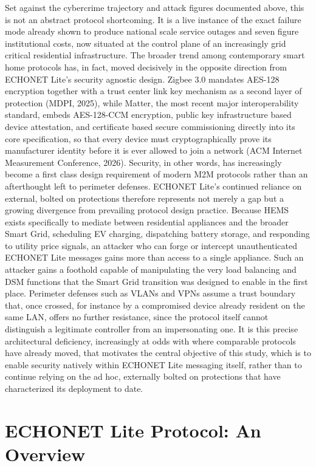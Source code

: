 Set against the cybercrime trajectory and attack figures documented above, this is not an abstract protocol shortcoming. It is a live instance of the exact failure mode already shown to produce national scale service outages and seven figure institutional costs, now situated at the control plane of an increasingly grid critical residential infrastructure. The broader trend among contemporary smart home protocols has, in fact, moved decisively in the opposite direction from ECHONET Lite's security agnostic design. Zigbee 3.0 mandates AES-128 encryption together with a trust center link key mechanism as a second layer of protection (MDPI, 2025), while Matter, the most recent major interoperability standard, embeds AES-128-CCM encryption, public key infrastructure based device attestation, and certificate based secure commissioning directly into its core specification, so that every device must cryptographically prove its manufacturer identity before it is ever allowed to join a network (ACM Internet Measurement Conference, 2026). Security, in other words, has increasingly become a first class design requirement of modern M2M protocols rather than an afterthought left to perimeter defenses. ECHONET Lite's continued reliance on external, bolted on protections therefore represents not merely a gap but a growing divergence from prevailing protocol design practice. Because HEMS exists specifically to mediate between residential appliances and the broader Smart Grid, scheduling EV charging, dispatching battery storage, and responding to utility price signals, an attacker who can forge or intercept unauthenticated ECHONET Lite messages gains more than access to a single appliance. Such an attacker gains a foothold capable of manipulating the very load balancing and DSM functions that the Smart Grid transition was designed to enable in the first place. Perimeter defenses such as VLANs and VPNs assume a trust boundary that, once crossed, for instance by a compromised device already resident on the same LAN, offers no further resistance, since the protocol itself cannot distinguish a legitimate controller from an impersonating one. It is this precise architectural deficiency, increasingly at odds with where comparable protocols have already moved, that motivates the central objective of this study, which is to enable security natively within ECHONET Lite messaging itself, rather than to continue relying on the ad hoc, externally bolted on protections that have characterized its deployment to date.

\section{ECHONET Lite Protocol: An Overview}


